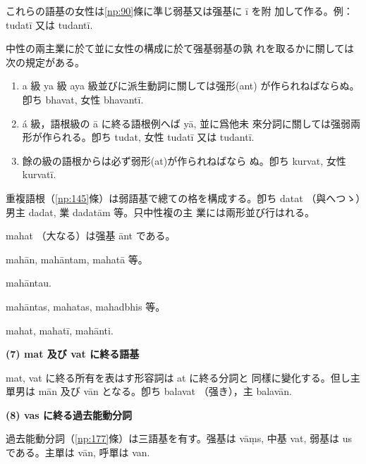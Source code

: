 \numberParagraph \label{np:89}
これらの語基の女性は\ref{np:90}條に準じ弱基又は强基に ī を附
加して作る。例：tudatī 又は tudantī.

\numberParagraph \label{np:90}
中性の兩主業に於て並に女性の構成に於て强基弱基の孰
れを取るかに關しては次の規定がある。
\begin{enumerate}[label=(\alph*)]
\item a 級 ya 級 aya 級並びに派生動詞に關しては强形(ant)
  が作られねばならぬ。卽ち bhavat, 女性 bhavantī.
\item á 級，語根級の ā に終る語根例へば yā, 並に爲他未
  來分詞に關しては强弱兩形が作られる。卽ち tudat, 女性
  tudatī 又は tudantī.
\item 餘の級の語根からは必ず弱形(at)が作られねばなら
  ぬ。卽ち kurvat, 女性 kurvatī.
\end{enumerate}

\numberParagraph
重複語根（\ref{np:145}條）は弱語基で總ての格を構成する。卽ち
datat （與へつゝ）男主 dadat, 業 dadatām 等。只中性複の主
業には兩形並び行はれる。

\numberParagraph
mahat （大なる）は强基 ānt である。
\begin{description}[font=\normalfont]
\item[男，單] mahān, mahāntam, mahatā 等。
\item[兩] mahāntau.
\item[複] mahāntas, mahatas, mahadbhis 等。
\item[中] mahat, mahatī, mahānti.
\end{description}

\begin{center}\textbf{(7) mat 及び vat に終る語基}\end{center}

\numberParagraph
mat, vat に終る所有を表はす形容詞は at に終る分詞と
同樣に變化する。但し主單男は mān 及び vān となる。卽ち
balavat （强き），主 balavān.

\begin{center}\textbf{(8) vas に終る過去能動分詞}\end{center}

\numberParagraph \label{np:94}
過去能動分詞（\ref{np:177}條）は三語基を有す。强基は vāṃs,
中基 vat, 弱基は us である。主單は vān, 呼單は van.

